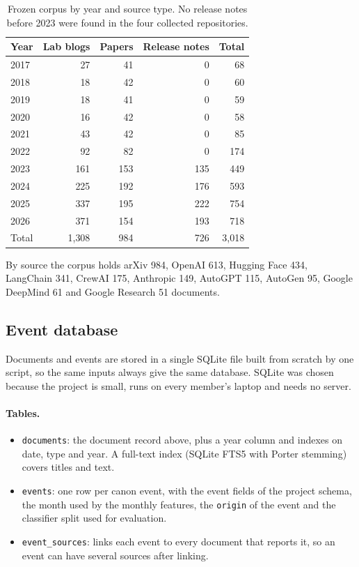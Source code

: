 \documentclass[11pt,a4paper]{article}
\newcommand{\code}[1]{\texttt{#1}}
\begin{document}
\begin{table}[ht]
\centering
\small
\begin{tabular}{@{}lrrrr@{}}
\toprule
Year & Lab blogs & Papers & Release notes & Total \\
\midrule
2017 & 27 & 41 & 0 & 68 \\
2018 & 18 & 42 & 0 & 60 \\
2019 & 18 & 41 & 0 & 59 \\
2020 & 16 & 42 & 0 & 58 \\
2021 & 43 & 42 & 0 & 85 \\
2022 & 92 & 82 & 0 & 174 \\
2023 & 161 & 153 & 135 & 449 \\
2024 & 225 & 192 & 176 & 593 \\
2025 & 337 & 195 & 222 & 754 \\
2026 & 371 & 154 & 193 & 718 \\
\midrule
Total & 1{,}308 & 984 & 726 & 3{,}018 \\
\bottomrule
\end{tabular}
\caption{Frozen corpus by year and source type. No release notes before 2023 were found in the four
collected repositories.}
\label{tab:corpus}
\end{table}

By source the corpus holds arXiv 984, OpenAI 613, Hugging Face 434, LangChain 341, CrewAI 175, Anthropic 149,
AutoGPT 115, AutoGen 95, Google DeepMind 61 and Google Research 51 documents.

\subsection{Event database}
\label{sec:db}
Documents and events are stored in a single SQLite file built from scratch by one script, so the same inputs
always give the same database. SQLite was chosen because the project is small, runs on every member's laptop
and needs no server.

\paragraph{Tables.}
\begin{itemize}
\item \code{documents}: the document record above, plus a year column and indexes on date, type and year. A
full-text index (SQLite FTS5 with Porter stemming) covers titles and text.
\item \code{events}: one row per canon event, with the event fields of the project schema, the month used by
the monthly features, the \code{origin} of the event and the classifier split used for evaluation.
\item \code{event\_sources}: links each event to every document that reports it, so an event can have several
sources after linking.
\end{itemize}
\end{document}

